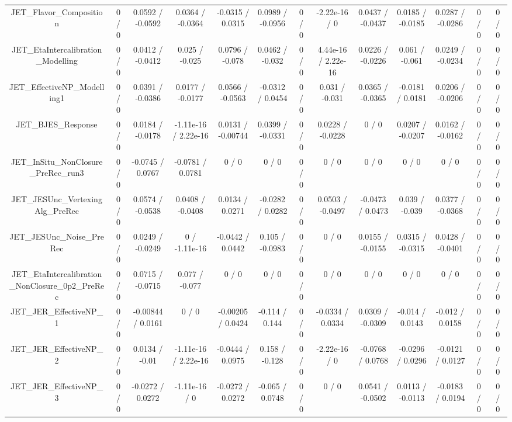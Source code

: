 \documentclass[10pt]{article}
\begin{document}
\begin{table}[htbp]
\begin{center}
\begin{tabular}{|c|c|c|c|c|c|c|c|c|c|c|c|c|}
  JET_Flavor_Composition & 0 / 0 & 0.0592 / -0.0592 & 0.0364 / -0.0364 & -0.0315 / 0.0315 & 0.0989 / -0.0956 & 0 / 0 & -2.22e-16 / 0 & 0.0437 / -0.0437 & 0.0185 / -0.0185 & 0.0287 / -0.0286 & 0 / 0 & 0 / 0 \\ 
  JET_EtaIntercalibration_Modelling & 0 / 0 & 0.0412 / -0.0412 & 0.025 / -0.025 & 0.0796 / -0.078 & 0.0462 / -0.032 & 0 / 0 & 4.44e-16 / 2.22e-16 & 0.0226 / -0.0226 & 0.061 / -0.061 & 0.0249 / -0.0234 & 0 / 0 & 0 / 0 \\ 
  JET_EffectiveNP_Modelling1 & 0 / 0 & 0.0391 / -0.0386 & 0.0177 / -0.0177 & 0.0566 / -0.0563 & -0.0312 / 0.0454 & 0 / 0 & 0.031 / -0.031 & 0.0365 / -0.0365 & -0.0181 / 0.0181 & 0.0206 / -0.0206 & 0 / 0 & 0 / 0 \\ 
  JET_BJES_Response & 0 / 0 & 0.0184 / -0.0178 & -1.11e-16 / 2.22e-16 & 0.0131 / -0.00744 & 0.0399 / -0.0331 & 0 / 0 & 0.0228 / -0.0228 & 0 / 0 & 0.0207 / -0.0207 & 0.0162 / -0.0162 & 0 / 0 & 0 / 0 \\ 
  JET_InSitu_NonClosure_PreRec_run3 & 0 / 0 & -0.0745 / 0.0767 & -0.0781 / 0.0781 & 0 / 0 & 0 / 0 & 0 / 0 & 0 / 0 & 0 / 0 & 0 / 0 & 0 / 0 & 0 / 0 & 0 / 0 \\ 
  JET_JESUnc_VertexingAlg_PreRec & 0 / 0 & 0.0574 / -0.0538 & 0.0408 / -0.0408 & 0.0134 / 0.0271 & -0.0282 / 0.0282 & 0 / 0 & 0.0503 / -0.0497 & -0.0473 / 0.0473 & 0.039 / -0.039 & 0.0377 / -0.0368 & 0 / 0 & 0 / 0 \\ 
  JET_JESUnc_Noise_PreRec & 0 / 0 & 0.0249 / -0.0249 & 0 / -1.11e-16 & -0.0442 / 0.0442 & 0.105 / -0.0983 & 0 / 0 & 0 / 0 & 0.0155 / -0.0155 & 0.0315 / -0.0315 & 0.0428 / -0.0401 & 0 / 0 & 0 / 0 \\ 
  JET_EtaIntercalibration_NonClosure_0p2_PreRec & 0 / 0 & 0.0715 / -0.0715 & 0.077 / -0.077 & 0 / 0 & 0 / 0 & 0 / 0 & 0 / 0 & 0 / 0 & 0 / 0 & 0 / 0 & 0 / 0 & 0 / 0 \\ 
  JET_JER_EffectiveNP_1 & 0 / 0 & -0.00844 / 0.0161 & 0 / 0 & -0.00205 / 0.0424 & -0.114 / 0.144 & 0 / 0 & -0.0334 / 0.0334 & 0.0309 / -0.0309 & -0.014 / 0.0143 & -0.012 / 0.0158 & 0 / 0 & 0 / 0 \\ 
  JET_JER_EffectiveNP_2 & 0 / 0 & 0.0134 / -0.01 & -1.11e-16 / 2.22e-16 & -0.0444 / 0.0975 & 0.158 / -0.128 & 0 / 0 & -2.22e-16 / 0 & -0.0768 / 0.0768 & -0.0296 / 0.0296 & -0.0121 / 0.0127 & 0 / 0 & 0 / 0 \\ 
  JET_JER_EffectiveNP_3 & 0 / 0 & -0.0272 / 0.0272 & -1.11e-16 / 0 & -0.0272 / 0.0272 & -0.065 / 0.0748 & 0 / 0 & 0 / 0 & 0.0541 / -0.0502 & 0.0113 / -0.0113 & -0.0183 / 0.0194 & 0 / 0 & 0 / 0 \\ 

\end{tabular}
\end{center}
\end{table}
\end{document}

